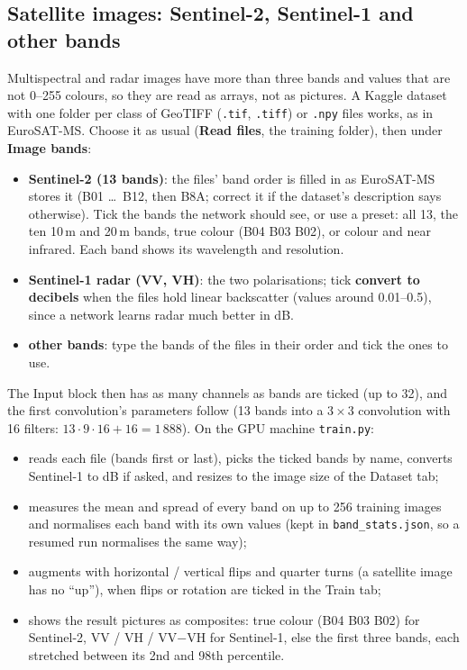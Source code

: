\documentclass[11pt,a4paper]{article}
\newcommand{\ui}[1]{\textbf{\textsf{#1}}}
\newcommand{\file}[1]{\texttt{#1}}
\begin{document}
\subsection{Satellite images: Sentinel-2, Sentinel-1 and other bands}
\label{sec:bands}
Multispectral and radar images have more than three bands and values that are not 0--255 colours, so they are read as arrays, not as
pictures. A Kaggle dataset with one folder per class of GeoTIFF (\file{.tif}, \file{.tiff}) or \file{.npy} files works, as in
EuroSAT-MS. Choose it as usual (\ui{Read files}, the training folder), then under \ui{Image bands}:
\begin{itemize}[nosep]
  \item \ui{Sentinel-2 (13 bands)}: the files' band order is filled in as EuroSAT-MS stores it (B01 \dots\ B12, then B8A; correct it if
        the dataset's description says otherwise). Tick the bands the network should see, or use a preset: all 13, the ten 10\,m and 20\,m
        bands, true colour (B04 B03 B02), or colour and near infrared. Each band shows its wavelength and resolution.
  \item \ui{Sentinel-1 radar (VV, VH)}: the two polarisations; tick \ui{convert to decibels} when the files hold linear backscatter
        (values around 0.01--0.5), since a network learns radar much better in dB.
  \item \ui{other bands}: type the bands of the files in their order and tick the ones to use.
\end{itemize}
The Input block then has as many channels as bands are ticked (up to 32), and the first convolution's parameters follow (13 bands into a
$3\times3$ convolution with 16 filters: $13\cdot9\cdot16+16 = 1\,888$). On the GPU machine \file{train.py}:
\begin{itemize}[nosep]
  \item reads each file (bands first or last), picks the ticked bands by name, converts Sentinel-1 to dB if asked, and resizes to the image
        size of the Dataset tab;
  \item measures the mean and spread of every band on up to 256 training images and normalises each band with its own values (kept in
        \file{band\_stats.json}, so a resumed run normalises the same way);
  \item augments with horizontal / vertical flips and quarter turns (a satellite image has no ``up''), when flips or rotation are ticked
        in the Train tab;
  \item shows the result pictures as composites: true colour (B04 B03 B02) for Sentinel-2, VV / VH / VV$-$VH for Sentinel-1, else the
        first three bands, each stretched between its 2nd and 98th percentile.
\end{itemize}
\end{document}
